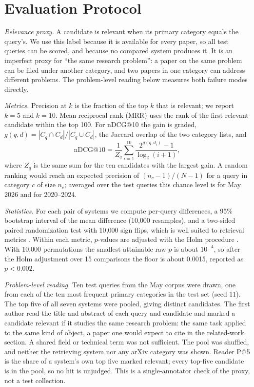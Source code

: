 \documentclass[conference]{IEEEtran}
\begin{document}
\section{Evaluation Protocol}
\label{sec:eval}

\textit{Relevance proxy.} A candidate is relevant when its primary category equals the query's. We use this label because it is available for every paper, so all test queries can be scored, and because no compared system produces it. It is an imperfect proxy for ``the same research problem'': a paper on the same problem can be filed under another category, and two papers in one category can address different problems. The problem-level reading below measures both failure modes directly.

\textit{Metrics.} Precision at $k$ is the fraction of the top $k$ that is relevant; we report $k=5$ and $k=10$. Mean reciprocal rank (MRR) uses the rank of the first relevant candidate within the top 100. For nDCG@10 the gain is graded, $g(q,d)=|C_q\cap C_d|/|C_q\cup C_d|$, the Jaccard overlap of the two category lists, and
\begin{equation}
\mathrm{nDCG@10}=\frac{1}{Z_q}\sum_{i=1}^{10}\frac{2^{g(q,d_i)}-1}{\log_2(i+1)},
\label{eq:ndcg}
\end{equation}
where $Z_q$ is the same sum for the ten candidates with the largest gain. A random ranking would reach an expected precision of $(n_c-1)/(N-1)$ for a query in category $c$ of size $n_c$; averaged over the test queries this chance level is  for May 2026 and  for 2020--2024.

\textit{Statistics.} For each pair of systems we compute per-query differences, a 95\% bootstrap interval of the mean difference (10{,}000 resamples), and a two-sided paired randomization test with 10{,}000 sign flips, which is well suited to retrieval metrics \cite{smucker2007significance}. Within each metric, $p$-values are adjusted with the Holm procedure \cite{holm1979}. With 10{,}000 permutations the smallest attainable raw $p$ is about $10^{-4}$, so after the Holm adjustment over 15 comparisons the floor is about 0.0015, reported as $p<0.002$.

\textit{Problem-level reading.} Ten test queries from the May corpus were drawn, one from each of the ten most frequent primary categories in the test set (seed 11). The top five of all seven systems were pooled, giving  distinct candidates. The first author read the title and abstract of each query and candidate and marked a candidate relevant if it studies the same research problem: the same task applied to the same kind of object, a paper one would expect to cite in the related-work section. A shared field or technical term was not sufficient. The pool was shuffled, and neither the retrieving system nor any arXiv category was shown. Reader P@5 is the share of a system's own top five marked relevant; every top-five candidate is in the pool, so no hit is unjudged. This is a single-annotator check of the proxy, not a test collection.
\end{document}
